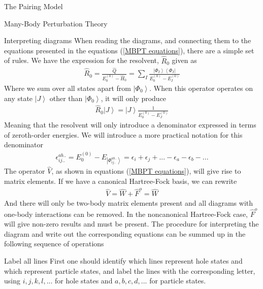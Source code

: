 \documentclass[twoside,english]{uiofysmaster}
\begin{document}
\begin{chapter}{The Pairing Model}
\begin{section}{Many-Body Perturbation Theory}
		\begin{subsection}{Interpreting diagrams}
			When reading the diagrams, and connecting them to the equations presented in the equations (\ref{MBPT equations}), there are a simple set of rules. We have the expression for the resolvent, $\hat R_0$ given as 
			\begin{align}
				\hat R_0 = \frac{\hat Q}{E_0^{(0)} - \hat H_0} = \sum_I \frac{\left| \Phi_I \right> \left< \Phi_I \right| }{E_0^{(0)} - E_I^{(0)}}
			\end{align}
			Where we sum over all states apart from $\left| \Phi_0 \right>$. When this operator operates on any state $\left| J \right>$ other than $\left| \Phi_0 \right> $, it will only produce \cite{ShavittAndBartlett}
			\begin{align}
				\hat R_0 \left| J \right> = \left| J \right> \frac{1}{E_0^{(0)} - E_J^{(0)}}
			\end{align}
			Meaning that the resolvent will only introduce a denominator expressed in terms of zeroth-order energies. We will introduce a more practical notation for this denominator
			\begin{align}
				\epsilon_{ij..}^{ab..} = E_0^{(0)} - E_{\left| \Phi_{ij..}^{ab..} \right> } = \epsilon_i + \epsilon_j + ... - \epsilon_a - \epsilon_b - ...
			\end{align}
			The operator $\hat V$, as shown in equations (\ref{MBPT equations}), will give rise to matrix elements. If we have a canonical Hartree-Fock basis, we can rewrite 
			\begin{align}
				\hat V = \hat W + \hat F^o = \hat W 
			\end{align}
			And there will only be two-body matrix elements present and all diagrams with one-body interactions can be removed. In the noncanonical Hartree-Fock case, $\hat F^o$ will give non-zero results and must be present. The procedure for interpreting the diagram and write out the corresponding equations can be summed up in the following sequence of operations
		\end{subsection}

		\begin{subsection}{Label all lines}
			First one should identify which lines represent hole states and which represent particle states, and label the lines with the corresponding letter, using $i,j,k,l,...$ for hole states and $a,b,c,d,...$ for particle states. 
		\end{subsection}


\end{section}
\end{chapter}
\end{document}
